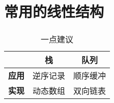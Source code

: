 \section{常用的线性结构}




\begin{frame}
    \frametitle{\insertsectionhead}
        \begin{table}
            \small
            \caption{一点建议}
            \label{tab:stack_queue_suggestions}
            \begin{tabular}{rcc}
                \toprule
                & \textbf{栈} & \textbf{队列} \\
                \midrule
                \textbf{应用} & 逆序记录 & 顺序缓冲 \\
                \textbf{实现} & 动态数组 & 双向链表 \\
                \bottomrule
            \end{tabular}
        \end{table}
\end{frame}